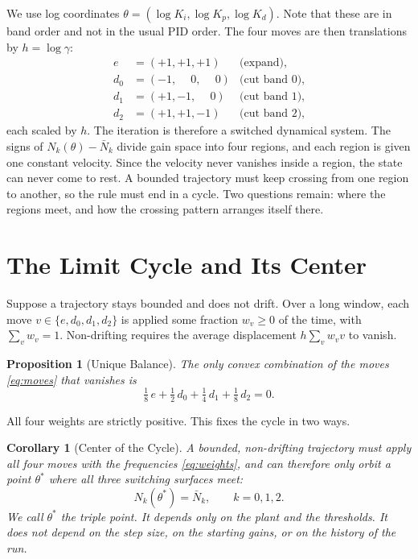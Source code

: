 \documentclass[letterpaper, 10pt, conference, twocolumn]{ieeeconf}
\newtheorem{proposition}{Proposition}
\newtheorem{corollary}{Corollary}
\newcommand{\Nbar}{\bar{N}}
\begin{document}
We use log coordinates $\theta = (\log K_i, \log K_p, \log K_d)$. Note that
these are in band order and not in the usual PID order. The four moves are then
translations by $h = \log\gamma$:
\begin{equation}
\begin{aligned}
e   &= (+1, +1, +1) &\text{(expand),}\\
d_0 &= (-1, \phantom{+}0, \phantom{+}0) &\text{(cut band 0),}\\
d_1 &= (+1, -1, \phantom{+}0) &\text{(cut band 1),}\\
d_2 &= (+1, +1, -1) &\text{(cut band 2),}
\end{aligned}
\label{eq:moves}
\end{equation}
each scaled by $h$. The iteration is therefore a switched dynamical system.
The signs of $N_k(\theta) - \Nbar_k$ divide gain space into four regions, and
each region is given one constant velocity. Since the velocity never vanishes
inside a region, the state can never come to rest. A bounded trajectory must
keep crossing from one region to another, so the rule must end in a cycle. Two
questions remain: where the regions meet, and how the crossing pattern arranges
itself there.

\section{The Limit Cycle and Its Center}
\label{sec:cycle}

Suppose a trajectory stays bounded and does not drift. Over a long window,
each move $v \in \{e, d_0, d_1, d_2\}$ is applied some fraction $w_v \ge 0$ of
the time, with $\sum_v w_v = 1$. Non-drifting requires the average
displacement $h \sum_v w_v v$ to vanish.

\begin{proposition}[Unique Balance]
\label{prop:balance}
The only convex combination of the moves \eqref{eq:moves} that vanishes is
\begin{equation}
\tfrac{1}{8}\, e + \tfrac{1}{2}\, d_0 + \tfrac{1}{4}\, d_1
+ \tfrac{1}{8}\, d_2 = 0.
\label{eq:weights}
\end{equation}
\end{proposition}

All four weights are strictly positive. This fixes the cycle in two ways.

\begin{corollary}[Center of the Cycle]
\label{cor:triple}
A bounded, non-drifting trajectory must apply all four moves with the
frequencies \eqref{eq:weights}, and can therefore only orbit a point
$\theta^*$ where all three switching surfaces meet:
\begin{equation}
N_k(\theta^*) = \Nbar_k, \qquad k = 0, 1, 2.
\label{eq:triplepoint}
\end{equation}
We call $\theta^*$ the \emph{triple point}. It depends only on the plant and
the thresholds. It does not depend on the step size, on the starting gains, or
on the history of the run.
\end{corollary}
\end{document}
